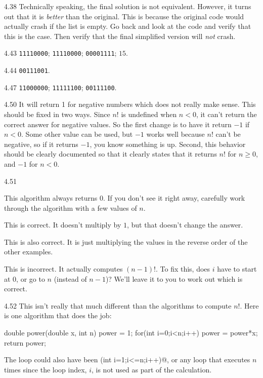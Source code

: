 \begin{Answer}{4.38}
Technically speaking, the final solution is not equivalent.
However, it turns out that it is {\em better} than the
original.  This is because the original code would actually crash if the list is empty.
Go back and look at the code and verify that this is the case.
Then verify that the
final simplified version will {\em not} crash.
\end{Answer}
\begin{Answer}{4.43}
\verb+11110000+; \verb+11110000+; \verb+00001111+; $15$.
\end{Answer}
\begin{Answer}{4.44}
\verb+00111001+.
\end{Answer}
\begin{Answer}{4.47}
 \verb+11000000+; \verb+11111100+; \verb+00111100+.
 
\end{Answer}
\begin{Answer}{4.50}
It will return 1 for negative numbers which does not really make sense.
This should be fixed in two ways.
Since $n!$ is undefined when $n<0$, it can't return the correct answer for negative values.
So the first change is to have it return $-1$ if $n<0$.
Some other value can be used, but $-1$ works well because $n!$ can't be negative, so if it returns $-1$, you know something is up.
Second, this behavior should be clearly documented so that it clearly states that it returns $n!$ for $n\geq 0$, and $-1$ for $n<0$.
\end{Answer}
\begin{Answer}{4.51}
\begin{solevalenum}
\item
This algorithm always returns $0$.  If you don't see it right away, carefully work through the algorithm
with a few values of $n$.
\item
This is correct.  It doesn't multiply by $1$, but that doesn't change the answer.
\item
This is also correct.  It is just multiplying the values in the reverse order of the other examples.
\item
This is incorrect.  It actually computes $(n-1)!$.
To fix this, does $i$ have to start at $0$, or go to $n$ (instead of $n-1$)?
We'll leave it to you to work out which is correct.
\end{solevalenum}
\end{Answer}
\begin{Answer}{4.52}
This isn't really that much different than the algorithms to compute $n!$.
Here is one algorithm that does the job:
\begin{code}
    double power(double x, int n) {
        power = 1;
        for(int i=0;i<n;i++) {
            power = power*x;
        }
        return power;
    }
\end{code}
The loop could also have been \verb@for(int i=1;i<=n;i++)@,
or any loop that executes $n$ times since the loop index, $i$, is not used as part
of the calculation.
\end{Answer}
